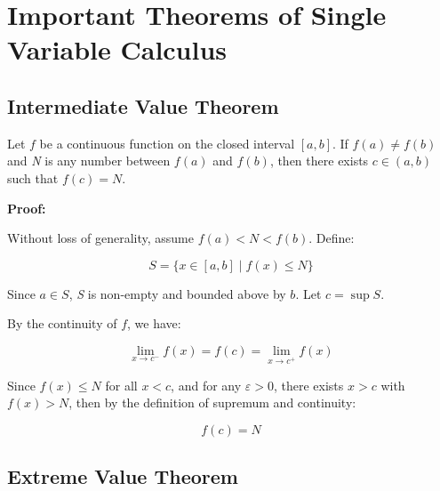 \newpage
\section{Important Theorems of Single Variable Calculus}

\subsection{Intermediate Value Theorem}

Let \(f\) be a continuous function on the closed interval \([a, b]\). If \( f(a) \ne f(b) \) 
and \emph{N} is any number between \( f(a) \) and \( f(b) \), then there exists \( c \in (a, b) \) 
such that \( f(c) = N \).
\vspace{\baselineskip}

\textbf{Proof:}  

Without loss of generality, assume \( f(a) < N < f(b) \).  
Define:

\[
    S = \{ x \in [a, b] \mid f(x) \le N \}
\]

Since \( a \in S \), \emph{S} is non-empty and bounded above by \(b\). Let \( c = \sup S \).

By the continuity of \(f\), we have:

\[
    \lim_{x \to c^-} f(x) = f(c) = \lim_{x \to c^+} f(x)
\]

Since \( f(x) \le N \) for all \( x < c \), and for any \( \varepsilon > 0 \), 
there exists \( x > c \) with \( f(x) > N \), then by the definition of supremum and continuity:

\[
    f(c) = N
\]

\QED

\begin{center}
\end{center}

\subsection{Extreme Value Theorem}

